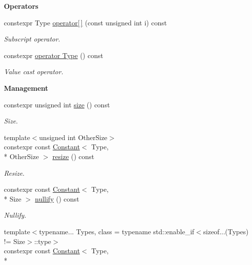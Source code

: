 \begin{Indent}{\bf Operators}
\begin{DoxyCompactItemize}
constexpr Type \hyperlink{exceptionmagrathea_1_1Constant_aef20a71fff0ab3603853a88890483a16}{operator\mbox{[}$\,$\mbox{]}} (const unsigned int i) const 
\begin{DoxyCompactList}\small\item\em Subscript operator. \end{DoxyCompactList}\item 
constexpr \hyperlink{exceptionmagrathea_1_1Constant_a688efcf2658cfc56a673b805bfe8c6e8}{operator Type} () const 
\begin{DoxyCompactList}\small\item\em Value cast operator. \end{DoxyCompactList}\end{DoxyCompactItemize}
\end{Indent}
\begin{Indent}{\bf Management}\par
\begin{DoxyCompactItemize}
\item 
constexpr unsigned int \hyperlink{exceptionmagrathea_1_1Constant_a3aefe057e6f4f298863b2c0c75c28a25}{size} () const 
\begin{DoxyCompactList}\small\item\em Size. \end{DoxyCompactList}\item 
{\footnotesize template$<$unsigned int Other\-Size$>$ }\\constexpr const \hyperlink{exceptionmagrathea_1_1Constant}{Constant}$<$ Type, \\*
Other\-Size $>$ \hyperlink{exceptionmagrathea_1_1Constant_aa33774cade64bdea5405fa5e9e699a61}{resize} () const 
\begin{DoxyCompactList}\small\item\em Resize. \end{DoxyCompactList}\item 
constexpr const \hyperlink{exceptionmagrathea_1_1Constant}{Constant}$<$ Type, \\*
Size $>$ \hyperlink{exceptionmagrathea_1_1Constant_a55416d49403c9d3e91b223f45d5d48ef}{nullify} () const 
\begin{DoxyCompactList}\small\item\em Nullify. \end{DoxyCompactList}\item 
{\footnotesize template$<$typename... Types, class  = typename std\-::enable\-\_\-if$<$sizeof...(\-Types) != Size$>$\-::type$>$ }\\constexpr const \hyperlink{exceptionmagrathea_1_1Constant}{Constant}$<$ Type, \\*

\end{DoxyCompactItemize}
\end{Indent}
